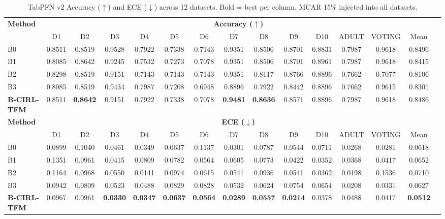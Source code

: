 \documentclass[conference]{IEEEtran}
\begin{document}
\begin{table}[t]
\caption{TabPFN v2 Accuracy ($\uparrow$) and ECE ($\downarrow$) across 12 datasets.
Bold = best per column. MCAR 15\% injected into all datasets.}
\label{tab:main}
\centering
\small
\setlength{\tabcolsep}{4pt}
\begin{tabular}{lcccccccccccccc}
\toprule
\multirow{2}{*}{\textbf{Method}} &
\multicolumn{13}{c}{\textbf{Accuracy ($\uparrow$)}} \\
\cmidrule(lr){2-14}
& D1 & D2 & D3 & D4 & D5 & D6 & D7 & D8 & D9 & D10 & ADULT & VOTING & Mean \\
\midrule
B0 & 0.8511 & 0.8519 & 0.9528 & 0.7922 & 0.7338 & 0.7143 & 0.9351 & 0.8506 & 0.8701 & 0.8831 & 0.7987 & 0.9618 & 0.8496 \\
B1 & 0.8085 & 0.8642 & 0.9245 & 0.7532 & 0.7273 & 0.7078 & 0.9351 & 0.8506 & 0.8701 & 0.8961 & 0.7987 & 0.9618 & 0.8415 \\
B2 & 0.8298 & 0.8519 & 0.9151 & 0.7143 & 0.7143 & 0.7143 & 0.9351 & 0.8117 & 0.8766 & 0.8896 & 0.7662 & 0.7077 & 0.8106 \\
B3 & 0.8085 & 0.8519 & 0.9434 & 0.7987 & 0.7208 & 0.6948 & 0.8896 & 0.7922 & 0.8442 & 0.8896 & 0.7662 & 0.9615 & 0.8301 \\
\textbf{B-CIRL-TFM} & 0.8511 & \textbf{0.8642} & 0.9151 & 0.7922 & 0.7338 & 0.7078 & \textbf{0.9481} & \textbf{0.8636} & 0.8571 & 0.8896 & 0.7987 & 0.9618 & 0.8486 \\
\midrule
\multirow{2}{*}{\textbf{Method}} &
\multicolumn{13}{c}{\textbf{ECE ($\downarrow$)}} \\
\cmidrule(lr){2-14}
& D1 & D2 & D3 & D4 & D5 & D6 & D7 & D8 & D9 & D10 & ADULT & VOTING & Mean \\
\midrule
B0 & 0.0899 & 0.1040 & 0.0461 & 0.0349 & 0.0637 & 0.1137 & 0.0301 & 0.0787 & 0.0544 & 0.0711 & 0.0268 & 0.0281 & 0.0618 \\
B1 & 0.1351 & 0.0961 & 0.0415 & 0.0809 & 0.0782 & 0.0564 & 0.0605 & 0.0773 & 0.0422 & 0.0352 & 0.0368 & 0.0417 & 0.0652 \\
B2 & 0.1164 & 0.0968 & 0.0550 & 0.0141 & 0.0974 & 0.0615 & 0.0541 & 0.0936 & 0.0541 & 0.0362 & 0.0198 & 0.1536 & 0.0710 \\
B3 & 0.0942 & 0.0809 & 0.0523 & 0.0488 & 0.0829 & 0.0828 & 0.0532 & 0.0624 & 0.0754 & 0.0654 & 0.0208 & 0.0331 & 0.0627 \\
\textbf{B-CIRL-TFM} & 0.0967 & 0.0961 & \textbf{0.0330} & \textbf{0.0347} & \textbf{0.0637} & \textbf{0.0564} & \textbf{0.0289} & \textbf{0.0557} & \textbf{0.0214} & 0.0378 & 0.0488 & 0.0417 & \textbf{0.0512} \\
\bottomrule
\end{tabular}
\end{table}
\end{document}
